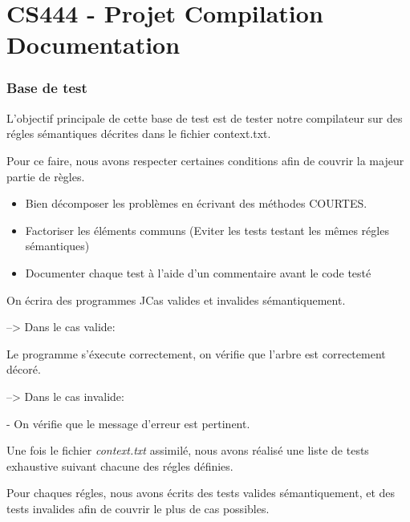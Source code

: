 \part*{CS444 - Projet Compilation \\ Documentation}


\section*{Base de test}

    L'objectif principale de cette base de test est de tester notre compilateur
    sur des régles sémantiques décrites dans le fichier context.txt.

    \vspace{3mm}

    Pour ce faire, nous avons respecter certaines conditions afin de couvrir
    la majeur partie de règles.

    \vspace{3mm}

    \begin{itemize}
        \item Bien décomposer les problèmes en écrivant des méthodes COURTES.
        \item Factoriser les éléments communs (Eviter les tests testant les mêmes régles sémantiques)
        \item Documenter chaque test à l'aide d'un commentaire avant le code testé
    \end{itemize}

    \vspace{3mm}

    On écrira des programmes JCas valides et invalides sémantiquement.

    \vspace{3mm}

       --> Dans le cas valide:

    \tab   Le programme s'éxecute correctement, on vérifie que l'arbre
            est correctement décoré.

    \vspace{3mm}

        --> Dans le cas invalide:

    \tab     - On vérifie que le message d'erreur est pertinent.

    \vspace{10mm}

    Une fois le fichier \emph{context.txt} assimilé, nous avons réalisé une liste
    de tests exhaustive suivant chacune des régles définies.

    \vspace{3mm}

    Pour chaques régles, nous avons écrits des tests valides sémantiquement, et des
    tests invalides afin de couvrir le plus de cas possibles.
